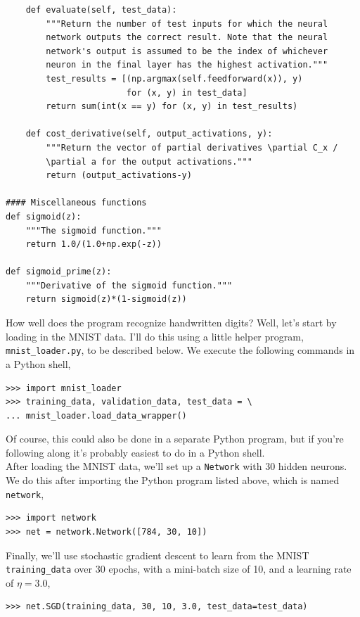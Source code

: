 \begin{lstlisting}
    def evaluate(self, test_data):
        """Return the number of test inputs for which the neural
        network outputs the correct result. Note that the neural
        network's output is assumed to be the index of whichever
        neuron in the final layer has the highest activation."""
        test_results = [(np.argmax(self.feedforward(x)), y)
                        for (x, y) in test_data]
        return sum(int(x == y) for (x, y) in test_results)

    def cost_derivative(self, output_activations, y):
        """Return the vector of partial derivatives \partial C_x /
        \partial a for the output activations."""
        return (output_activations-y)

#### Miscellaneous functions
def sigmoid(z):
    """The sigmoid function."""
    return 1.0/(1.0+np.exp(-z))

def sigmoid_prime(z):
    """Derivative of the sigmoid function."""
    return sigmoid(z)*(1-sigmoid(z))
\end{lstlisting}

How well does the program recognize handwritten digits? Well, let's start by loading in the MNIST data. I'll do this using a little helper program, \texttt{mnist\_loader.py}, to be described below. We execute the following commands in a Python shell,

\begin{lstlisting}
>>> import mnist_loader
>>> training_data, validation_data, test_data = \
... mnist_loader.load_data_wrapper()
\end{lstlisting}

Of course, this could also be done in a separate Python program, but if you're following along it's probably easiest to do in a Python shell.\\

After loading the MNIST data, we'll set up a \texttt{Network} with 30 hidden neurons. We do this after importing the Python program listed above, which is named \texttt{network},

\begin{lstlisting}
>>> import network
>>> net = network.Network([784, 30, 10])
\end{lstlisting}

Finally, we'll use stochastic gradient descent to learn from the MNIST \texttt{training\_data} over 30 epochs, with a mini-batch size of 10, and a learning rate of $\eta=3.0$,

\begin{lstlisting}
>>> net.SGD(training_data, 30, 10, 3.0, test_data=test_data)
\end{lstlisting}


